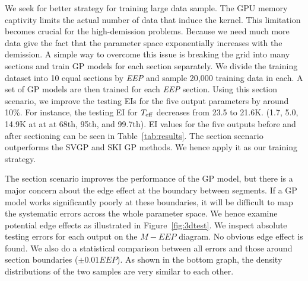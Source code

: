 We seek for better strategy for training large data sample.
The GPU memory captivity limits the actual number of data that induce the kernel. This limitation becomes crucial for the high-demission problems. Because we need much more data give the fact that the parameter space exponentially increases with the demission. 
%
A simple way to overcome this issue is breaking the grid into many sections and train GP models for each section separately. 
We divide the training dataset into 10 equal sections by {\it EEP} and sample 20,000 training data in each. A set of GP models are then trained for each {\it EEP} section. 
%
Using this section scenario, we improve the testing EIs for the five output parameters by around 10\%. For instance, the testing EI for $T_{\rm eff}$ decreases from 23.5 to 21.6K. (1.7, 5.0, 14.9K at at  at 68th, 95th, and 99.7th). EI values for the five outputs before and after sectioning can be seen in Table~\ref{tab:results}.  The section scenario outperforms the SVGP and SKI GP methods. We hence apply it as our training strategy. 
 
The section scenario improves the performance of the GP model, but there is a major concern about the edge effect at the boundary between segments. If a GP model works significantly poorly at these boundaries, it will be difficult to map the systematic errors across the whole parameter space. We hence examine potential edge effects as illustrated in Figure~\ref{fig:3dtest}. We inspect absolute testing errors for each output on the $M-EEP$ diagram. No obvious edge effect is found. We also do a statistical comparison between all errors and those around section boundaries ($\pm0.01EEP$). As shown in the bottom graph, the density distributions of the two samples are very similar to each other. 




